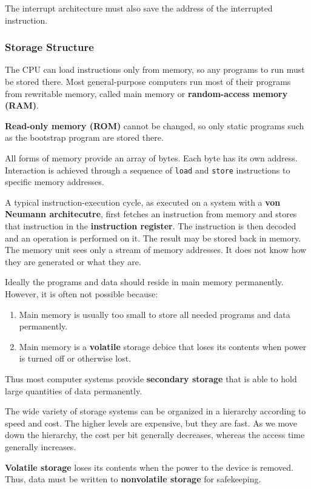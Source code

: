 \documentclass[]{article}
\begin{document}
The interrupt architecture must also save the address of the interrupted
instruction.

\subsubsection*{Storage Structure}
The CPU can load instructions only from memory, so any programs to run must be
stored there. Most general-purpose computers run most of their programs from
rewritable memory, called main memory or \textbf{random-access memory (RAM)}.

\textbf{Read-only memory (ROM)} cannot be changed, so only static programs such
as the bootstrap program are stored there.

All forms of memory provide an array of bytes. Each byte has its own address.
Interaction is achieved through a sequence of \texttt{load} and \texttt{store}
instructions to specific memory addresses.

A typical instruction-execution cycle, as executed on a system with a
\textbf{von Neumann architecutre}, first fetches an instruction from memory and
stores that instruction in the \textbf{instruction register}. The instruction is
then decoded and an operation is performed on it. The result may be stored back
in memory. The memory unit sees only a stream of memory addresses. It does not
know how they are generated or what they are.

Ideally the programs and data should reside in main memory permanently. However,
it is often not possible because:
\begin{enumerate}
\item Main memory is usually too small to store all needed programs and data
permanently.
\item Main memory is a \textbf{volatile} storage debice that loses its contents
when power is turned off or otherwise lost.
\end{enumerate}

Thus most computer systems provide \textbf{secondary storage} that is able to
hold large quantities of data permanently.

The wide variety of storage systems can be organized in a hierarchy according to
speed and cost. The higher levels are expensive, but they are fast. As we move
down the hierarchy, the cost per bit generally decreases, whereas the access
time generally increases.

\textbf{Volatile storage} loses its contents when the power to the device is
removed. Thus, data must be written to \textbf{nonvolatile storage} for
safekeeping.
\end{document}

